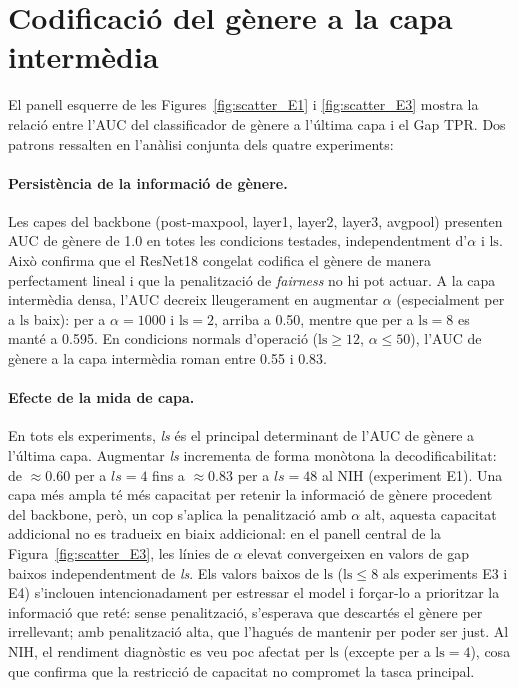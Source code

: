 \documentclass[a4paper,12pt,twoside]{ThesisStyle}
\begin{document}
\section{Codificació del gènere a la capa intermèdia}

El panell esquerre de les Figures~\ref{fig:scatter_E1} i \ref{fig:scatter_E3} mostra la relació entre l'AUC del classificador de gènere a l'última capa i el Gap TPR. Dos patrons ressalten en l'anàlisi conjunta dels quatre experiments:

\paragraph{Persistència de la informació de gènere.}
Les capes del backbone (post-maxpool, layer1, layer2, layer3, avgpool) presenten AUC de gènere de 1.0 en totes les condicions testades, independentment d'$\alpha$ i $\text{ls}$. Això confirma que el ResNet18 congelat codifica el gènere de manera perfectament lineal i que la penalització de \textit{fairness} no hi pot actuar. A la capa intermèdia densa, l'AUC decreix lleugerament en augmentar $\alpha$ (especialment per a $\text{ls}$ baix): per a $\alpha = 1000$ i $\text{ls} = 2$, arriba a 0.50, mentre que per a $\text{ls} = 8$ es manté a 0.595. En condicions normals d'operació ($\text{ls} \geq 12$, $\alpha \leq 50$), l'AUC de gènere a la capa intermèdia roman entre 0.55 i 0.83.

\paragraph{Efecte de la mida de capa.}
En tots els experiments, \textit{ls} és el principal determinant de l'AUC de gènere a l'última capa. Augmentar \textit{ls} incrementa de forma monòtona la decodificabilitat: de $\approx 0.60$ per a $ls = 4$ fins a $\approx 0.83$ per a $ls = 48$ al NIH (experiment E1). Una capa més ampla té més capacitat per retenir la informació de gènere procedent del backbone, però, un cop s'aplica la penalització amb $\alpha$ alt, aquesta capacitat addicional no es tradueix en biaix addicional: en el panell central de la Figura~\ref{fig:scatter_E3}, les línies de $\alpha$ elevat convergeixen en valors de gap baixos independentment de \textit{ls}. Els valors baixos de $\text{ls}$ ($\text{ls} \leq 8$ als experiments E3 i E4) s'inclouen intencionadament per estressar el model i forçar-lo a prioritzar la informació que reté: sense penalització, s'esperava que descartés el gènere per irrellevant; amb penalització alta, que l'hagués de mantenir per poder ser just. Al NIH, el rendiment diagnòstic es veu poc afectat per $\text{ls}$ (excepte per a $\text{ls} = 4$), cosa que confirma que la restricció de capacitat no compromet la tasca principal.
\end{document}
